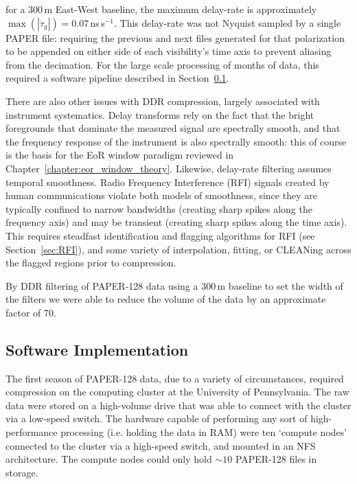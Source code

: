 for a 300\,m East-West baseline, the maximum delay-rate is approximately $\max(|\dot{\tau}_g|) = 0.07$\,ns\,s$^{-1}$. This delay-rate was not Nyquist sampled by a single PAPER file: requiring the previous and next files generated for that polarization to be appended on either side of each visibility's time axis to prevent aliasing from the decimation. For the large scale processing of months of data, this required a software pipeline described in Section~\ref{subsec:compression_software}.

There are also other issues with DDR compression, largely associated with instrument systematics. Delay transforms rely on the fact that the bright foregrounds that dominate the measured signal are spectrally smooth, and that the frequency response of the instrument is also spectrally smooth: this of course is the basis for the EoR window paradigm reviewed in Chapter~\ref{chapter:eor_window_theory}. Likewise, delay-rate filtering assumes temporal smoothness. Radio Frequency Interference (RFI) signals created by human communications violate both models of smoothness, since they are typically confined to narrow bandwidths (creating sharp spikes along the frequency axis) and may be transient (creating sharp spikes along the time axis). This requires steadfast identification and flagging algorithms for RFI (see Section~\ref{sec:RFI}), and some variety of interpolation, fitting, or CLEANing across the flagged regions prior to compression.

By DDR filtering of PAPER-128 data using a 300\,m baseline to set the width of the filters we were able to reduce the volume of the data by an approximate factor of 70.

\subsection{Software Implementation}
\label{subsec:compression_software}

The first season of PAPER-128 data, due to a variety of circumstances, required compression on the computing cluster at the University of Pennsylvania. The raw data were stored on a high-volume drive that was able to connect with the cluster via a low-speed switch. The hardware capable of performing any sort of high-performance processing (i.e. holding the data in RAM) were ten `compute nodes' connected to the cluster via a high-speed switch, and mounted in an NFS architecture. The compute nodes could only hold $\sim 10$ PAPER-128 files in storage. 

